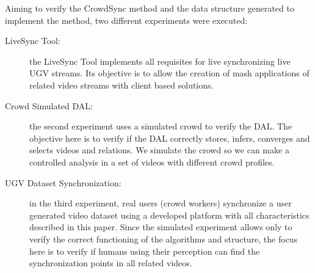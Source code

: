 Aiming to verify the CrowdSync method and the data structure generated to implement the method, two different experiments were executed:

\begin{description}
	\item[LiveSync Tool:] the LiveSync Tool implements all requisites for live synchronizing live UGV streams. Its objective is to allow the creation of mash applications of related video streams with client based solutions.
	\item[Crowd Simulated DAL:] the second experiment uses a simulated crowd to verify the DAL. The objective here is to verify if the DAL correctly stores, infers, converges and selects videos and relations. We simulate the crowd so we can make a controlled analysis in a set of videos with different crowd profiles.
	\item[UGV Dataset Synchronization:] in the third experiment, real users (crowd workers) synchronize a user generated video dataset using a developed platform with all characteristics described in this paper. Since the simulated experiment allows only to verify the correct functioning of the algorithms and structure, the focus here is to verify if humans using their perception can find the synchronization points in all related videos.
\end{description}




